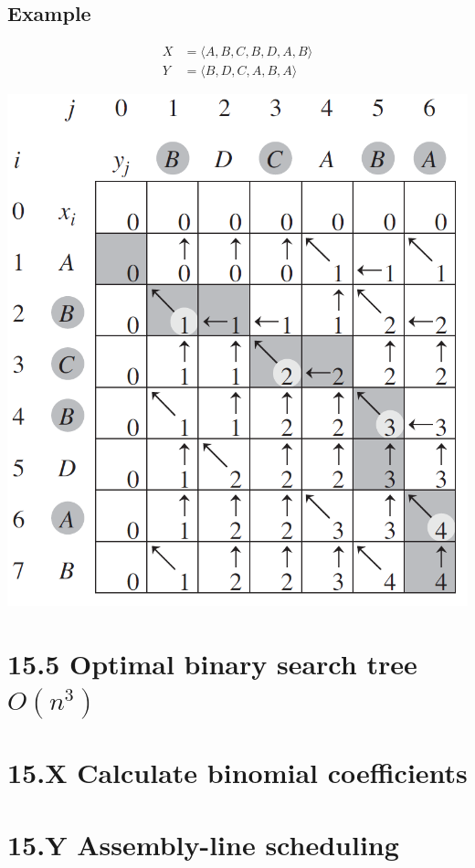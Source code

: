 \documentclass[a4paper]{article}
\begin{document}
\subsection*{Example}
    \begin{align*}
        X&=\langle A,B,C,B,D,A,B\rangle\\
        Y&=\langle B,D,C,A,B,A\rangle
    \end{align*}
    \begin{center}
        \includegraphics[scale=0.6]{"Longest common subsequence"}
    \end{center}

\section*{15.5 Optimal binary search tree $O(n^3)$}

\section*{15.X Calculate binomial coefficients}

\section*{15.Y Assembly-line scheduling}
\end{document}

